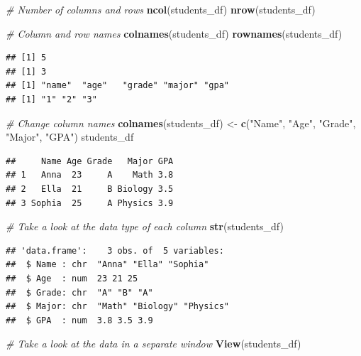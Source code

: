\documentclass[
]{book}
\newenvironment{Shaded}{\begin{snugshade}}{\end{snugshade}}
\newcommand{\CommentTok}[1]{\textcolor[rgb]{0.56,0.35,0.01}{\textit{#1}}}
\newcommand{\FunctionTok}[1]{\textcolor[rgb]{0.13,0.29,0.53}{\textbf{#1}}}
\newcommand{\NormalTok}[1]{#1}
\newcommand{\OtherTok}[1]{\textcolor[rgb]{0.56,0.35,0.01}{#1}}
\newcommand{\StringTok}[1]{\textcolor[rgb]{0.31,0.60,0.02}{#1}}
\begin{document}
\begin{Shaded}
\begin{Highlighting}[]
\CommentTok{\# Number of columns and rows}
\FunctionTok{ncol}\NormalTok{(students\_df)}
\FunctionTok{nrow}\NormalTok{(students\_df)}

\CommentTok{\# Column and row names}
\FunctionTok{colnames}\NormalTok{(students\_df)}
\FunctionTok{rownames}\NormalTok{(students\_df)}
\end{Highlighting}
\end{Shaded}

\begin{verbatim}
## [1] 5
## [1] 3
## [1] "name"  "age"   "grade" "major" "gpa"  
## [1] "1" "2" "3"
\end{verbatim}

\begin{Shaded}
\begin{Highlighting}[]
\CommentTok{\# Change column names}
\FunctionTok{colnames}\NormalTok{(students\_df) }\OtherTok{\textless{}{-}} \FunctionTok{c}\NormalTok{(}\StringTok{"Name"}\NormalTok{, }\StringTok{"Age"}\NormalTok{, }\StringTok{"Grade"}\NormalTok{, }\StringTok{"Major"}\NormalTok{, }\StringTok{"GPA"}\NormalTok{)}
\NormalTok{students\_df}
\end{Highlighting}
\end{Shaded}

\begin{verbatim}
##     Name Age Grade   Major GPA
## 1   Anna  23     A    Math 3.8
## 2   Ella  21     B Biology 3.5
## 3 Sophia  25     A Physics 3.9
\end{verbatim}

\begin{Shaded}
\begin{Highlighting}[]
\CommentTok{\# Take a look at the data type of each column}
\FunctionTok{str}\NormalTok{(students\_df)}
\end{Highlighting}
\end{Shaded}

\begin{verbatim}
## 'data.frame':    3 obs. of  5 variables:
##  $ Name : chr  "Anna" "Ella" "Sophia"
##  $ Age  : num  23 21 25
##  $ Grade: chr  "A" "B" "A"
##  $ Major: chr  "Math" "Biology" "Physics"
##  $ GPA  : num  3.8 3.5 3.9
\end{verbatim}

\begin{Shaded}
\begin{Highlighting}[]
\CommentTok{\# Take a look at the data in a separate window}
\FunctionTok{View}\NormalTok{(students\_df)}
\end{Highlighting}
\end{Shaded}
\end{document}
